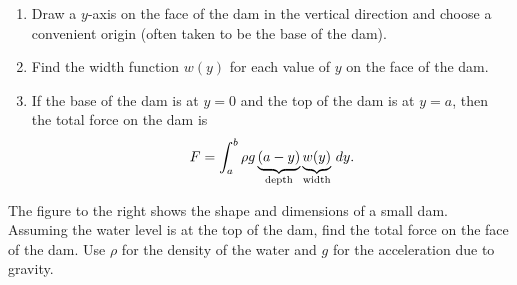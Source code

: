 \documentclass[../mathNotesPreamble]{subfiles}
\begin{document}
  \begin{thmBox*}
    \begin{enumerate}
      \item 
        Draw a $y$-axis on the face of the dam in the vertical direction and choose a convenient origin (often taken to be the base of the dam).
      \item 
        Find the width function $w(y)$ for each value of $y$ on the face of the dam.
      \item 
        If the base of the dam is at $y=0$ and the top of the dam is at $y=a$, then the total force on the dam is
          \[F=\int_a^b \rho g\underbrace{(a-y)}_{\textnormal{depth}}\underbrace{w(y)}_{\textnormal{width}}\,dy.\]
    \end{enumerate}
  \end{thmBox*}

  \begin{ex*}
    The figure to the right shows the shape and dimensions of a small dam. Assuming the water level is at the top of the dam, find the total force on the face of the dam. Use $\rho$ for the density of the water and $g$ for the acceleration due to gravity.
  \end{ex*}
  \begin{flushright}
  \end{flushright}
  \pagebreak
\end{document}
